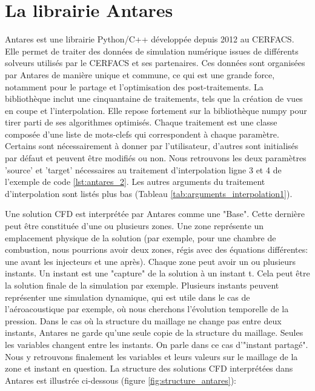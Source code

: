 \section{La librairie Antares}

Antares est une librairie Python/C++ développée depuis 2012 au CERFACS. Elle permet de traiter des données de simulation numérique issues de différents solveurs utilisés par le CERFACS et ses partenaires. Ces données sont organisées par Antares de manière unique et commune, ce qui est une grande force, notamment pour le partage et l'optimisation des post-traitements.
La bibliothèque inclut une cinquantaine de traitements, tels que la création de vues en coupe et l'interpolation.
Elle repose fortement sur la bibliothèque numpy pour tirer parti de ses algorithmes optimisés. %
Chaque traitement est une classe composée d'une liste de mots-clefs qui correspondent à chaque paramètre. Certains sont nécessairement à donner par l'utilisateur, d'autres sont initialisés par défaut et peuvent être modifiés ou non. Nous retrouvons les deux paramètres 'source' et 'target' nécessaires au traitement d'interpolation ligne 3 et 4 de l'exemple de code \ref{lst:antares_2}. Les autres arguments du traitement d'interpolation sont listés plus bas (Tableau \ref{tab:arguments_interpolation1}).

Une solution CFD est interprétée par Antares comme une "Base".
Cette dernière peut être constituée d'une ou plusieurs zones.
Une zone représente un emplacement physique de la solution (par exemple, pour une chambre de combustion, nous pourrions avoir deux zones, régis avec des équations différentes: une avant les injecteurs et une après). %
Chaque zone peut avoir un ou plusieurs instants.
Un instant est une "capture" de la solution à un instant t. Cela peut être la solution finale de la simulation par exemple. Plusieurs instants peuvent représenter une simulation dynamique, qui est utile dans le cas de l'aéroacoustique par exemple, où nous cherchons l'évolution temporelle de la pression.
Dans le cas où la structure du maillage ne change pas entre deux instants, Antares ne garde qu'une seule copie de la structure du maillage. Seules les variables changent entre les instants. On parle dans ce cas d'"instant partagé".\label{instants_partages}
Nous y retrouvons finalement les variables et leurs valeurs sur le maillage de la zone et instant en question.
La structure des solutions CFD interprétées dans Antares est illustrée ci-dessous (figure \ref{fig:structure_antares}):

